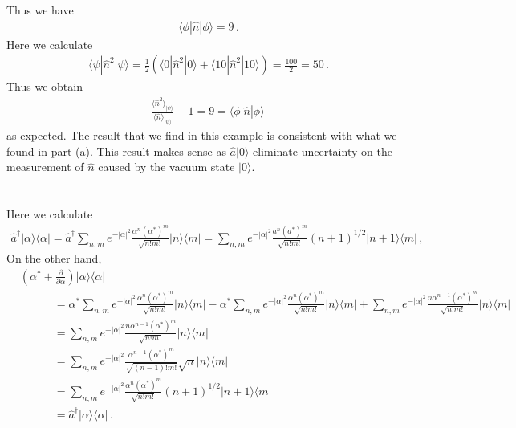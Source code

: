 \documentclass[11pt, oneside]{book}
\theoremstyle{break}
\theoremstyle{break}
\newcommand{\pd}{\partial}
\begin{document}
Thus we have
\begin{align*}
\langle \phi | \hat{n}|\phi\rangle = 9\,.
\end{align*}
Here we calculate
\begin{align*}
\langle \psi| \hat{n}^2 |\psi\rangle = 
\frac{1}{2}\left( \langle 0 |\hat{n}^2 |0\rangle + 
\langle 10 |\hat{n}^2|10\rangle
\right) = \frac{100}{2} = 50\,.
\end{align*}
Thus we obtain
\begin{align*}
\frac{\langle \hat{n}^2\rangle_{|\psi\rangle} }{\langle  \hat{n}\rangle_{|\psi\rangle}} - 1 = 9 = \langle \phi | \hat{n} | \phi\rangle\,
\end{align*}
as expected. The result that we find in this example is consistent with what we found in part (a). This result makes sense as $\hat{a}|0\rangle$ eliminate uncertainty on the measurement of $\hat{n}$ caused by the vacuum state $|0\rangle$. 

\chapter{}
Here we calculate
\begin{align*}
\hat{a}^\dagger |\alpha \rangle \langle \alpha | = \hat{a}^\dagger \sum_{n,m}e^{-|\alpha|^2}\frac{\alpha^n (\alpha^*)^{m}}{\sqrt{n!m!}} |n\rangle \langle m|
 = \sum_{n,m}e^{-|\alpha|^2}\frac{a^n (a^*)^{m}}{\sqrt{n!m!}}(n+1)^{1/2}|n+1\rangle \langle m|\,,
\end{align*}
On the other hand,
\begin{align*}
&\left( \alpha^* + \frac{\pd}{\pd \alpha}\right)
|\alpha \rangle \langle \alpha |\\
&{}\qquad\quad =
\alpha^* \sum_{n,m}e^{-|\alpha|^2}\frac{\alpha^n (\alpha^*)^{m}}{\sqrt{n!m!}} |n\rangle \langle m|
- \alpha^* \sum_{n,m}e^{-|\alpha|^2}\frac{\alpha^n (\alpha^*)^{m}}{\sqrt{n!m!}} |n\rangle \langle m|
+ \sum_{n,m}e^{-|\alpha|^2}\frac{n\alpha^{n-1} (\alpha^*)^{m}}{\sqrt{n!m!}} |n\rangle \langle m|\\
&{}\qquad\quad
=\sum_{n,m}e^{-|\alpha|^2}\frac{n\alpha^{n-1} (\alpha^*)^{m}}{\sqrt{n!m!}} |n\rangle \langle m|\\
&{}\qquad\quad
=\sum_{n,m}e^{-|\alpha|^2}\frac{ \alpha^{n-1} (\alpha^*)^{m}}{\sqrt{(n-1)!m!}} \sqrt{n}|n\rangle \langle m|\\
&{}\qquad\quad
=\sum_{n,m}e^{-|\alpha|^2}\frac{ \alpha^{n} (\alpha^*)^{m}}{\sqrt{n!m!}} (n+1)^{1/2}|n+1\rangle \langle m| \\
&{}\qquad\quad= \hat{a}^\dagger |\alpha \rangle \langle \alpha |\,.
\end{align*}
\newpage
\end{document}
